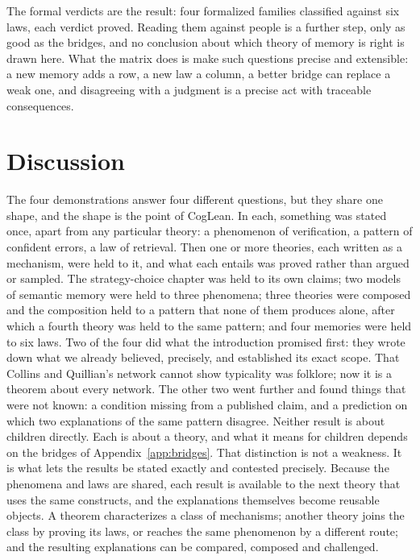 \documentclass[11pt]{article}
\begin{document}
The formal verdicts are the result: four formalized families
classified against six laws, each verdict proved. Reading them against
people is a further step, only as good as the bridges, and no
conclusion about which theory of memory is right is drawn here. What
the matrix does is make such questions precise and extensible: a new
memory adds a row, a new law a column, a better bridge can replace a
weak one, and disagreeing with a judgment is a precise act with
traceable consequences.

\section{Discussion}
\label{sec:disc}

The four demonstrations answer four different questions, but they
share one shape, and the shape is the point of CogLean. In each,
something was stated once, apart from any particular theory: a
phenomenon of verification, a pattern of confident errors, a law of
retrieval. Then one or more theories, each written as a mechanism,
were held to it, and what each entails was proved rather than argued
or sampled. The strategy-choice chapter was held to its own claims;
two models of semantic memory were held to three phenomena; three
theories were composed and the composition held to a pattern that
none of them produces alone, after which a fourth theory was held to
the same pattern; and four memories were held to six laws. Two of the
four did what the introduction promised first: they wrote down what
we already believed, precisely, and established its exact scope. That
Collins and Quillian's network cannot show typicality was folklore;
now it is a theorem about every network. The other two went further
and found things that were not known: a condition missing from a
published claim, and a prediction on which two explanations of the
same pattern disagree. Neither result is about children directly.
Each is about a theory, and what it means for children depends on the
bridges of Appendix~\ref{app:bridges}. That distinction is not a
weakness. It is what lets the results be stated exactly and
contested precisely. Because the phenomena and laws are shared, each result is available to the next
theory that uses the same constructs, and the explanations themselves
become reusable objects. A theorem characterizes a class of
mechanisms; another theory joins the class by proving its laws, or
reaches the same phenomenon by a different route; and the resulting
explanations can be compared, composed and challenged.
\end{document}
